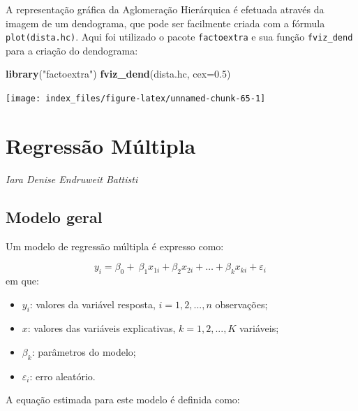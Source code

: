 \documentclass[12pt,brazil,oneside]{book}
\newenvironment{Shaded}{\begin{snugshade}}{\end{snugshade}}
\newcommand{\DataTypeTok}[1]{\textcolor[rgb]{0.13,0.29,0.53}{#1}}
\newcommand{\FloatTok}[1]{\textcolor[rgb]{0.00,0.00,0.81}{#1}}
\newcommand{\KeywordTok}[1]{\textcolor[rgb]{0.13,0.29,0.53}{\textbf{#1}}}
\newcommand{\NormalTok}[1]{#1}
\newcommand{\StringTok}[1]{\textcolor[rgb]{0.31,0.60,0.02}{#1}}
\begin{document}
A representação gráfica da Aglomeração Hierárquica é efetuada através da imagem de um dendograma, que pode ser facilmente criada com a fórmula \texttt{plot(dista.hc)}. Aqui foi utilizado o pacote \texttt{factoextra} e sua função \texttt{fviz\_dend} para a criação do dendograma:

\begin{Shaded}
\begin{Highlighting}[]
\KeywordTok{library}\NormalTok{(}\StringTok{"factoextra"}\NormalTok{)}
\KeywordTok{fviz_dend}\NormalTok{(dista.hc, }\DataTypeTok{cex=}\FloatTok{0.5}\NormalTok{)}
\end{Highlighting}
\end{Shaded}

\begin{center}\texttt{[image: index\_files/figure-latex/unnamed-chunk-65-1]} \end{center}

\hypertarget{regressao-multipla}{%
\chapter{Regressão Múltipla}\label{regressao-multipla}}

\emph{Iara Denise Endruweit Battisti}

\begin{flushright}
\emph{}
\end{flushright}

\hypertarget{modelo-geral}{%
\section{Modelo geral}\label{modelo-geral}}

Um modelo de regressão múltipla é expresso como:

\[ 
y_{i} = \beta_0+\ \beta_1x_{1i}+\beta_2x_{2i}+\dots+\beta_kx_{ki}+\varepsilon_i\ 
\]
\noindent
em que:

\begin{itemize}
\item
  \(y_{i}\): valores da variável resposta, \(i = 1, 2,..., n\) observações;
\item
  \(x\): valores das variáveis explicativas, \(k = 1, 2,..., K\) variáveis;
\item
  \(\beta_k\): parâmetros do modelo;
\item
  \(\varepsilon_i\): erro aleatório.
\end{itemize}

A equação estimada para este modelo é definida como:
\end{document}
